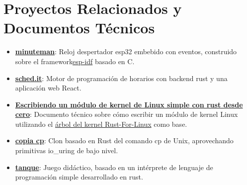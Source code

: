 \documentclass[letterpaper,11pt]{article}
\newcommand{\resumeItem}[2]{
  \item\small{
    \textbf{#1}{: #2 \vspace{-2pt}}
  }
}
\newcommand{\resumeSubItem}[2]{\resumeItem{#1}{#2}\vspace{-4pt}}
\newcommand{\resumeSubHeadingListStart}{\begin{itemize}[leftmargin=*]}
\newcommand{\resumeSubHeadingListEnd}{\end{itemize}}
\begin{document}
\section{Proyectos Relacionados y Documentos Técnicos}
\resumeSubHeadingListStart
\resumeSubItem{\href{https://github.com/ccarral/minuteman}{minuteman}}
{Reloj despertador esp32 embebido con eventos, construido sobre el framework\href{https://github.com/espressif/esp-idf}{esp-idf} basado en C.}
\resumeSubItem{\href{https://ccarral.github.io/schedit-client/?pools=https://ccarral.github.io/schedit-client/files/plantillaA.csv}{sched.it}}
{Motor de programación de horarios con backend rust y una aplicación web React.}
\resumeSubItem{\href{https://ccarral.github.io/en/projects/hello_world_kernel_module/}{Escribiendo
		un módulo de kernel de Linux simple con rust desde cero}}{Documento técnico sobre cómo escribir un módulo de kernel Linux utilizando el
	\href{https://github.com/Rust-for-Linux}{árbol del kernel Rust-For-Linux} como base.}
\resumeSubItem{\href{https://github.com/ccarral/cp_liburing}{copia cp}}
{Clon basado en Rust del comando cp de Unix, aprovechando primitivas io\_uring de bajo nivel.}
\resumeSubItem{\href{https://github.com/ccarral/tank-vue}{tanque}}
{Juego didáctico, basado en un intérprete de lenguaje de programación simple desarrollado en rust.}

\resumeSubHeadingListEnd
\end{document}
